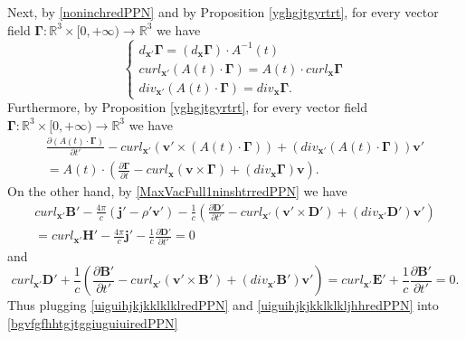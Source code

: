 \documentclass{article}
\theoremstyle{definition}
\theoremstyle{remark}
\renewcommand{\vec}[1]{\mathbf{#1}}
\newcommand{\R}{\mathbb{R}}
\newcommand{\er}{\eqref}
\newcommand{\R}{{\mathbb{R}}}
\newcommand{\er}{\eqref}
\begin{document}
Next, by \er{noninchredPPN} and by Proposition \ref{yghgjtgyrtrt},
for every vector field $\vec
\Gamma:\R^3\times[0,+\infty)\to\R^3$ we have
\begin{equation}
\label{vyguiuiujggghjjgredPPN}
\begin{cases}
d_{\vec x'}\vec \Gamma=\left(d_{\vec x}\vec \Gamma\right)\cdot A^{-1}(t)\\
curl_{\vec x'}\left( A(t)\cdot\vec \Gamma\right)=A(t)\cdot
curl_{\vec x}
\vec \Gamma\\
div_{\vec x'}\left( A(t)\cdot\vec \Gamma\right)=div_{\vec x}\vec
\Gamma.
\end{cases}
\end{equation}
Furthermore, by Proposition \ref{yghgjtgyrtrt},
for every vector field $\vec \Gamma:\R^3\times[0,+\infty)\to\R^3$ we
have
\begin{multline}\label{bgvfgfhhtgjtggiuguiuiredPPN}
\frac{\partial \left(A(t)\cdot\vec \Gamma\right)}{\partial
t'}-curl_{\vec x'}\left(\vec v'\times\left(A(t)\cdot\vec
\Gamma\right)\right)+\left({div}_{\vec x'}\left(A(t)\cdot\vec
\Gamma\right)\right)\vec v'\\=A(t)\cdot\left(\frac{\partial \vec
\Gamma}{\partial t}- curl_{\vec x}\left(\vec v\times
\vec\Gamma\right)+\left({div}_{\vec x}\vec \Gamma\right)\vec
v\right).
\end{multline}
On the other hand, by \er{MaxVacFull1ninshtrredPPN} we have
\begin{multline}\label{uiguihjkjkklklklredPPN}
curl_{\vec x'} \vec B'- \frac{4\pi}{c}\left(\vec j'-\rho'\vec
v'\right)-\frac{1}{c}\left(\frac{\partial \vec D'}{\partial
t'}-curl_{\vec x'}\left(\vec v'\times\vec
D'\right)+\left({div}_{\vec x'}\vec D'\right)\vec
v'\right)\\=curl_{\vec x'} \vec H'- \frac{4\pi}{c}\vec
j'-\frac{1}{c}\frac{\partial \vec D'}{\partial t'}=0\end{multline}
and
\begin{equation}\label{uiguihjkjkklklkljhhredPPN}
curl_{\vec x'} \vec D'+\frac{1}{c}\left(\frac{\partial \vec
B'}{\partial t'}-curl_{\vec x'}\left(\vec v'\times\vec
B'\right)+\left({div}_{\vec x'}\vec B'\right)\vec
v'\right)=curl_{\vec x'} \vec E'+\frac{1}{c}\frac{\partial \vec
B'}{\partial t'}=0.
\end{equation}
Thus plugging \er{uiguihjkjkklklklredPPN} and
\er{uiguihjkjkklklkljhhredPPN} into \er{bgvfgfhhtgjtggiuguiuiredPPN}
\end{document}
